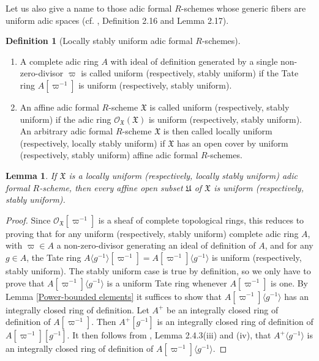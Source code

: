 \documentclass[12pt,twoside,a4paper]{article}
\newtheorem{lemma}[thm]{Lemma}
\theoremstyle{definition}
\newtheorem{mydef}[thm]{Definition}
\theoremstyle{remark}
\begin{document}
Let us also give a name to those adic formal $R$-schemes whose generic fibers are uniform adic spaces (cf. \cite{Nakazato-Shimomoto22}, Definition 2.16 and Lemma 2.17).
\begin{mydef}[Locally stably uniform adic formal $R$-schemes]\label{Locally stably uniform adic formal scheme}~\begin{enumerate}[(1)]\item A complete adic ring $A$ with ideal of definition generated by a single non-zero-divisor $\varpi$ is called uniform (respectively, stably uniform) if the Tate ring $A[\varpi^{-1}]$ is uniform (respectively, stably uniform). \item An affine adic formal $R$-scheme $\mathfrak{X}$ is called uniform (respectively, stably uniform) if the adic ring $\mathcal{O}_{\mathfrak{X}}(\mathfrak{X})$ is uniform (respectively, stably uniform). An arbitrary adic formal $R$-scheme $\mathfrak{X}$ is then called locally uniform (respectively, locally stably uniform) if $\mathfrak{X}$ has an open cover by uniform (respectively, stably uniform) affine adic formal $R$-schemes.\end{enumerate}\end{mydef}
\begin{lemma}\label{Uniformity is local}If $\mathfrak{X}$ is a locally uniform (respectively, locally stably uniform) adic formal $R$-scheme, then every affine open subset $\mathfrak{U}$ of $\mathfrak{X}$ is uniform (respectively, stably uniform).\end{lemma}
\begin{proof}Since $\mathcal{O}_{\mathfrak{X}}[\varpi^{-1}]$ is a sheaf of complete topological rings, this reduces to proving that for any uniform (respectively, stably uniform) complete adic ring $A$, with $\varpi\in A$ a non-zero-divisor generating an ideal of definition of $A$, and for any $g\in A$, the Tate ring $A\langle g^{-1}\rangle[\varpi^{-1}]=A[\varpi^{-1}]\langle g^{-1}\rangle$ is uniform (respectively, stably uniform). The stably uniform case is true by definition, so we only have to prove that $A[\varpi^{-1}]\langle g^{-1}\rangle$ is a uniform Tate ring whenever $A[\varpi^{-1}]$ is one. By Lemma \ref{Power-bounded elements} it suffices to show that $A[\varpi^{-1}]\langle g^{-1}\rangle$ has an integrally closed ring of definition. Let $A^{+}$ be an integrally closed ring of definition of $A[\varpi^{-1}]$. Then $A^{+}[g^{-1}]$ is an integrally closed ring of definition of $A[\varpi^{-1}][g^{-1}]$. It then follows from \cite{Huber0}, Lemma 2.4.3(iii) and (iv), that $A^{+}\langle g^{-1}\rangle$ is an integrally closed ring of definition of $A[\varpi^{-1}]\langle g^{-1}\rangle$.\end{proof}
\end{document}
